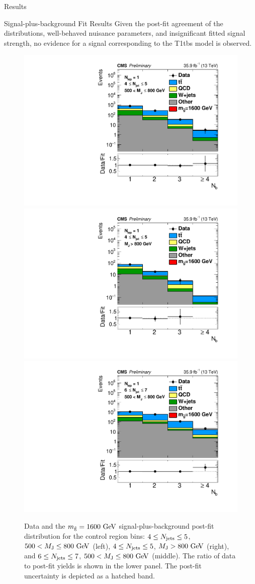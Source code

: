 \begin{section}{Results}
\begin{subsection}{Signal-plus-background Fit Results}
Given the post-fit agreement of the \Nb distributions, well-behaved nuisance parameters, and insignificant fitted signal strength, no evidence for a signal corresponding to the T1tbs model is observed.

\begin{figure}[tbp!]
\centering
\includegraphics[angle=0,width=0.32\columnwidth]{fig/splusb_nlep1_nj45_lowmj.pdf}
\includegraphics[angle=0,width=0.32\columnwidth]{fig/splusb_nlep1_nj45_highmj.pdf}
\includegraphics[angle=0,width=0.32\columnwidth]{fig/splusb_nlep1_nj67_lowmj.pdf}
\caption{Data and the $m_{\tilde{\mathrm{g}}} = 1600~\mathrm{Ge\kern -0.1em V}$ signal-plus-background post-fit \Nb distribution for the control region bins: $4 \leq N_{\mathrm{jets}} \leq 5$, $500 < M_{\mathrm{J}} \leq 800~\mathrm{Ge\kern -0.1em V}$ (left), $4 \leq N_{\mathrm{jets}} \leq 5$, $M_{\mathrm{J}} > 800~\mathrm{Ge\kern -0.1em V}$ (right), and $6 \leq N_{\mathrm{jets}} \leq 7$, $500 < M_{\mathrm{J}} \leq 800~\mathrm{Ge\kern -0.1em V}$ (middle).
The ratio of data to post-fit yields is shown in the lower panel.
The post-fit uncertainty is depicted as a hatched band.}
\label{fig:splusb_cr}
\end{figure}


\end{subsection}
\end{section}
